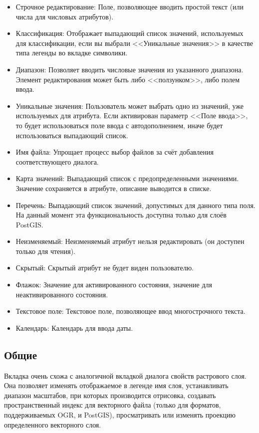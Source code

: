 \begin{itemize}[label=--]
\item Строчное редактирование: Поле, позволяющее вводить простой текст
(или числа для числовых атрибутов).
\item Классификация: Отображает выпадающий список значений, используемых для
классификации, если вы выбрали <<Уникальные значения>> в качестве типа легенды
во вкладке символики.
\item Диапазон: Позволяет вводить числовые значения из указанного
диапазона. Элемент редактирования может быть либо <<ползунком>>, либо
полем ввода.
\item Уникальные значения: Пользователь может выбрать одно из значений, уже
используемых для атрибута. Если активирован параметр <<Поле ввода>>, то
будет использоваться поле ввода с автодополнением, иначе будет использоваться
выпадающий список.
\item Имя файла: Упрощает процесс выбор файлов за счёт добавления
соответствующего диалога.
\item Карта значений: Выпадающий список с предопределенными значениями.
Значение сохраняется в атрибуте, описание выводится в списке.
\item Перечень: Выпадающий список значений, допустимых для данного типа
поля. На данный момент эта функциональность доступна только для слоёв PostGIS.
\item Неизменяемый: Неизменяемый атрибут нельзя редактировать (он
доступен только для чтения).
\item Скрытый: Скрытый атрибут не будет виден пользователю.
\item Флажок: Значение для активированного состояния, значение для
неактивированного состояния.
\item Текстовое поле: Текстовое поле, позволяющее ввод многострочного текста.
\item Календарь: Календарь для ввода даты.

\end{itemize}

\subsection{Общие}\label{vectorgeneraltab}

Вкладка  очень схожа с аналогичной вкладкой диалога свойств
растрового слоя. Она позволяет изменять отображаемое в легенде имя слоя,
устанавливать диапазон масштабов, при которых производится отрисовка,
создавать пространственный индекс для векторного файла (только для форматов,
поддерживаемых OGR, и PostGIS), просматривать или изменять проекцию
определенного векторного слоя.

